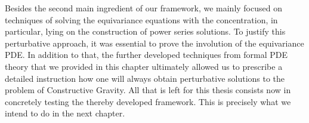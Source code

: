 Besides the second main ingredient of our framework, we mainly focused on techniques of solving the equivariance equations with the concentration, in particular, lying on the construction of power series solutions. To justify this perturbative approach, it was essential to prove the involution of the equivariance PDE. In addition to that, the further developed techniques from formal PDE theory that we provided in this chapter ultimately allowed us to prescribe a detailed instruction how one will always obtain perturbative solutions to the problem of Constructive Gravity.  All that is left for this thesis consists now in concretely testing the thereby developed framework. This is precisely what we intend to do in the next chapter.
